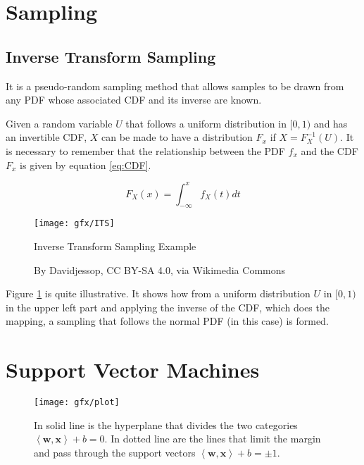 \section{Sampling}

\subsection{Inverse Transform Sampling} \label{sec:ITS}

It is a pseudo-random sampling method that allows samples to be drawn from any \ac{PDF} whose associated \ac{CDF} and its inverse are known.

Given a random variable \(U\) that follows a uniform distribution in  \([0, 1)\) and has an invertible \ac{CDF}, \(X\) can be made to have a distribution \(F_x\) if \(X = F_X^{-1}(U)\). It is necessary to remember that the relationship between the \ac{PDF} \(f_x\) and the \ac{CDF} \(F_x\) is given by equation \ref{eq:CDF}.

\begin{equation} \label{eq:CDF}
	F_X (x) = \int_{-\infty}^x f_X(t)dt
\end{equation}

\begin{figure}
	\myfloatalign
	\texttt{[image: gfx/ITS]}
	\caption{Inverse Transform Sampling Example}
	\caption*{By Davidjessop, CC BY-SA 4.0, via Wikimedia Commons}
	\label{fig:its}
\end{figure}

Figure \ref{fig:its} is quite illustrative. It shows how from a uniform distribution \(U\) in \([0,1)\) in the upper left part and applying the inverse of the \ac{CDF}, which does the mapping, a sampling that follows the normal \ac{PDF} (in this case) is formed.


\section{Support Vector Machines}

\begin{figure}
	\centering
	\texttt{[image: gfx/plot]}
	\caption[Support Vector Classifier]{In solid line is the hyperplane that divides the two categories \(\left \langle \mathbf{w}, \mathbf{x} \right \rangle + b = 0\). In dotted line are the lines that limit the margin and pass through the support vectors \(\left \langle \mathbf{w}, \mathbf{x} \right \rangle + b = \pm 1\).}
	\label{fig:hyperplane}
\end{figure}


